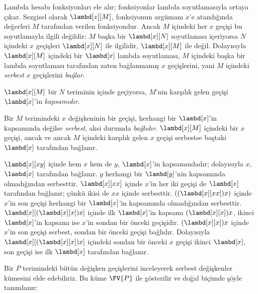 \documentclass[../../../include/open-logic-section]{subfiles}
\begin{document}

Lambda hesabı fonksiyonları ele alır; fonksiyonlar lambda soyutlamasıyla
ortaya çıkar. Sezgisel olarak $\lambd[x][M]$, fonksiyonun argümanı $x$'e
atandığında değerleri $M$ tarafından verilen fonksiyondur. Ancak $M$ içindeki
her $x$ geçişi bu soyutlamayla ilgili değildir: $M$ başka bir
$\lambd[x][N]$ soyutlaması içeriyorsa $N$ içindeki $x$ geçişleri
$\lambd[x][N]$ ile ilgilidir, $\lambd[x][M]$ ile değil. Dolayısıyla
$\lambd[x][M]$ içindeki bir $\lambd[x]$ lambda soyutlaması, $M$ içindeki
başka bir lambda soyutlaması tarafından zaten bağlanmamış $x$ geçişlerini,
yani $M$ içindeki \emph{serbest} $x$ geçişlerini \emph{bağlar}.

\begin{defn}[Kapsam]
$\lambd[x][M]$ bir $N$ teriminin içinde geçiyorsa, $M$'nin karşılık gelen
geçişi $\lambd[x]$'in \emph{kapsamıdır}.
\end{defn}


\begin{defn}
  Bir $M$ terimindeki $x$ değişkeninin bir geçişi, herhangi bir
  $\lambd[x]$'in kapsamında değilse \emph{serbest}, aksi durumda
  \emph{bağlıdır}. $\lambd[x][M]$ içindeki bir $x$ geçişi, ancak ve ancak
  $M$ içindeki karşılık gelen $x$ geçişi serbestse baştaki $\lambd[x]$
  tarafından bağlanır.
\end{defn}

\begin{ex}
  $\lambd[x][x y]$ içinde hem $x$ hem de $y$, $\lambd[x]$'in kapsamındadır;
  dolayısıyla $x$, $\lambd[x]$ tarafından bağlanır. $y$ herhangi bir
  $\lambd[y]$'nin kapsamında olmadığından serbesttir. $\lambd[x][x x]$
  içinde $x$'in her iki geçişi de $\lambd[x]$ tarafından bağlanır; çünkü
  ikisi de $xx$ içinde serbesttir. $((\lambd[x][xx])x)$ içinde $x$'in son
  geçişi herhangi bir $\lambd[x]$'in kapsamında olmadığından serbesttir.
  $\lambd[x][(\lambd[x][x])x]$ içinde ilk $\lambd[x]$'in kapsamı
  $(\lambd[x][x])x$, ikinci $\lambd[x]$'in kapsamı ise $x$'in sondan bir
  önceki geçişidir. $(\lambd[x][x])x$ içinde $x$'in son geçişi serbest,
  sondan bir önceki geçişi bağlıdır. Dolayısıyla
  $\lambd[x][(\lambd[x][x])x]$ içindeki sondan bir önceki $x$ geçişi ikinci
  $\lambd[x]$, son geçişi ise ilk $\lambd[x]$ tarafından bağlanır.
\end{ex}

Bir $P$ terimindeki bütün değişken geçişlerini inceleyerek serbest değişkenler
kümesini elde edebiliriz. Bu küme $\FV{P}$ ile gösterilir ve doğal biçimde
şöyle tanımlanır:
\end{document}
